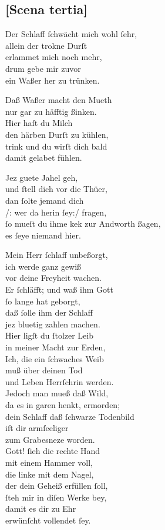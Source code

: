 \documentclass{ees}
\newenvironment{lyrics}[1]{%
  \subsection{#1}\nopagebreak%
  \begin{lyricslist}%
  \let\voice\item%
}{%
  \end{lyricslist}%
}
\begin{document}
\begin{lyrics}{[Scena tertia]}
  \voice[Sisera]
  Der Schlaff ſchwächt mich wohl ſehr,\\
  allein der trokne Durſt\\
  erlammet mich noch mehr,\\
  drum gebe mir zuvor\\
  ein Waßer her zu trünken.

  \voice[Jahel]
  Daß Waßer macht den Mueth\\
  nur gar zu häfftig ßinken.\\
  Hier haſt du Milch\\
  den härben Durſt zu kühlen,\\
  trink und du wirſt dich bald\\
  damit gelabet fühlen.

  \voice[Sisera]
  Jez guete Jahel geh,\\
  und ſtell dich vor die Thüer,\\
  dan ſolte jemand dich\\
  /: wer da herin ſey:/ fragen,\\
  ſo mueſt du ihme kek zur Andworth ßagen,\\
  es ſeye niemand hier.

  \voice[Jahel]
  Mein Herr ſchlaff unbeßorgt,\\
  ich werde ganz gewiß\\
  vor deine Freyheit wachen.\\[1ex]
  Er ſchläfft; und waß ihm Gott\\
  ſo lange hat geborgt,\\
  daß ſolle ihm der Schlaff\\
  jez bluetig zahlen machen.\\
  Hier ligſt du ſtolzer Leib\\
  in meiner Macht zur Erden,\\
  Ich, die ein ſchwaches Weib\\
  muß über deinen Tod\\
  und Leben Herrſchrin werden.\\
  Jedoch man mueß daß Wild,\\
  da es in garen henkt, ermorden;\\
  dein Schlaff daß ſchwarze Todenbild\\
  iſt dir armſeeliger\\
  zum Grabesneze worden.\\
  Gott! ſieh die rechte Hand\\
  mit einem Hammer voll,\\
  die linke mit dem Nagel,\\
  der dein Geheiß erfüllen ſoll,\\
  ſteh mir in diſen Werke bey,\\
  damit es dir zu Ehr\\
  erwünſcht vollendet ſey.
\end{lyrics}
\end{document}
